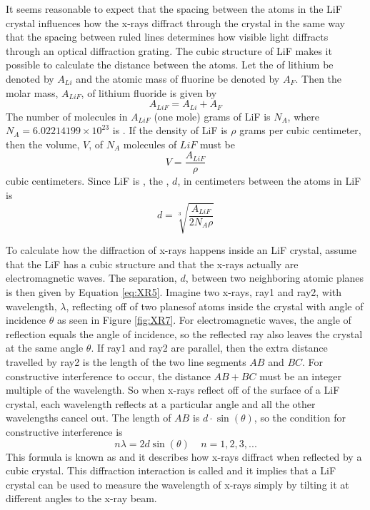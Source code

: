 \noindent It seems reasonable to expect that the spacing between the atoms in the LiF crystal influences how the x-rays diffract through the crystal in the same way that the spacing between ruled lines determines how visible light diffracts through an optical diffraction grating. The cubic structure of LiF makes it possible to calculate the distance between the atoms. Let the  of lithium be denoted by $A_{Li}$ and the atomic mass of fluorine be denoted by $A_F$. Then the molar mass, $A_{LiF}$, of lithium fluoride is given by\begin{equation}\label{eq:XR3}
    A_{LiF} = A_{Li} + A_F
\end{equation}
The number of molecules in $A_{LiF}$ (one mole) grams of LiF is $N_A$, where $N_A = 6.02214199\times 10^{23}$ is . If the density of LiF is $\rho$ grams per cubic centimeter, then the volume, $V$, of $N_A$ molecules of $LiF$ must be \begin{equation}\label{eq:XR4}
    V = \frac{A_{LiF}}{\rho}
\end{equation}
cubic centimeters. Since LiF is , the , $d$, in centimeters between the atoms in LiF is \begin{equation}\label{eq:XR5}
    d = \sqrt[3]{\frac{A_{LiF}}{2N_A\rho}}
\end{equation}

\noindent To calculate how the diffraction of x-rays happens inside an LiF crystal, assume that the LiF has a cubic structure and that the x-rays actually are electromagnetic waves. The separation, $d$, between two neighboring atomic planes is then given by Equation \ref{eq:XR5}. Imagine two x-rays, ray1 and ray2, with wavelength, $\lambda$, reflecting off of two planesof atoms inside the crystal with angle of incidence $\theta$ as seen in Figure \ref{fig:XR7}. For electromagnetic waves, the angle of reflection equals the angle of incidence, so the reflected ray also leaves the crystal at the same angle $\theta$. If ray1 and ray2 are parallel, then the extra distance travelled by ray2 is the length of the two line segments $AB$ and $BC$. For constructive interference to occur, the distance $AB+BC$ must be an integer multiple of the wavelength. So when x-rays reflect off of the surface of a LiF crystal, each wavelength reflects at a particular angle and all the other wavelengths cancel out. The length of $AB$ is $d\cdot \sin(\theta)$, so the condition for constructive interference is \begin{equation}\label{eq:XR6}
    n\lambda = 2d\sin(\theta)\;\;\;\;n=1,2,3,...
\end{equation}
This formula is known as  and it describes how x-rays diffract when reflected by a cubic crystal. This diffraction interaction is called  and it implies that a LiF crystal can be used to measure the wavelength of x-rays simply by tilting it at different angles to the x-ray beam.


